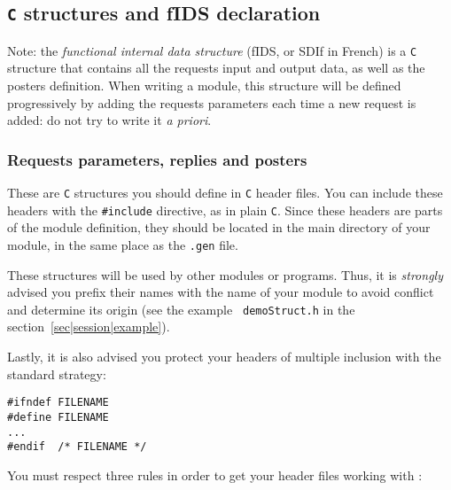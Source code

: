 \subsection{{\tt C} structures and fIDS declaration}

Note:  the  {\em functional internal  data  structure} (fIDS, or  SDIf in
French) is  a {\tt C} structure that  contains all the requests input and
output data,  as well as the  posters definition.  When writing a module,
this structure  will  be defined  progressively  by   adding the requests
parameters each time a new request is added: do not try to write it 
{\em a priori}.

\subsubsection{Requests parameters, replies and posters}

These are {\tt  C} structures you should define  in {\tt C} header files.
You can include  these headers with the {\tt  \#include} directive, as in
plain {\tt C}.  Since these headers are parts  of the  module definition,
they should be located in the main directory  of your module, in the same
place as the {\tt .gen} file.

These structures will be used by other modules or programs.  Thus, it is
{\em strongly} advised you prefix their names with the name of your
module to avoid conflict and determine its origin (see the example {\tt
demoStruct.h} in the section~\ref{sec|session|example}).

Lastly, it is also advised you protect your headers of multiple inclusion
with the standard strategy:

\begin{center}\begin{cartouche}\small\begin{verbatim}
#ifndef FILENAME
#define FILENAME
...
#endif  /* FILENAME */
\end{verbatim}\end{cartouche}\end{center}

You must respect three rules in order to get your header files working
with \GenoM:

